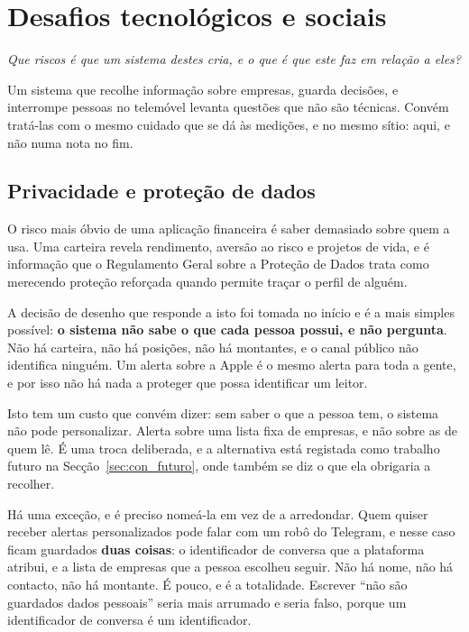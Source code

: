 \section{Desafios tecnológicos e sociais}
\label{sec:met_desafios}

\emph{Que riscos é que um sistema destes cria, e o que é que este faz em relação a eles?}

Um sistema que recolhe informação sobre empresas, guarda decisões, e interrompe pessoas no
telemóvel levanta questões que não são técnicas. Convém tratá-las com o mesmo cuidado que se dá
às medições, e no mesmo sítio: aqui, e não numa nota no fim.

\subsection{Privacidade e proteção de dados}
\label{sec:met_privacidade}

O risco mais óbvio de uma aplicação financeira é saber demasiado sobre quem a usa. Uma carteira
revela rendimento, aversão ao risco e projetos de vida, e é informação que o Regulamento Geral
sobre a Proteção de Dados trata como merecendo proteção reforçada quando permite traçar o perfil
de alguém.

A decisão de desenho que responde a isto foi tomada no início e é a mais simples possível: \textbf{o
sistema não sabe o que cada pessoa possui, e não pergunta}. Não há carteira, não há posições, não
há montantes, e o canal público não identifica ninguém. Um alerta sobre a Apple é o mesmo alerta
para toda a gente, e por isso não há nada a proteger que possa identificar um leitor.

Isto tem um custo que convém dizer: sem saber o que a pessoa tem, o sistema não pode
personalizar. Alerta sobre uma lista fixa de empresas, e não sobre as de quem lê. É uma troca
deliberada, e a alternativa está registada como trabalho futuro na Secção~\ref{sec:con_futuro},
onde também se diz o que ela obrigaria a recolher.

Há uma exceção, e é preciso nomeá-la em vez de a arredondar. Quem quiser receber alertas
personalizados pode falar com um robô do Telegram, e nesse caso ficam guardados \textbf{duas coisas}: o
identificador de conversa que a plataforma atribui, e a lista de empresas que a pessoa escolheu
seguir. Não há nome, não há contacto, não há montante. É pouco, e é a totalidade. Escrever
``não são guardados dados pessoais'' seria mais arrumado e seria falso, porque um identificador de
conversa é um identificador.

